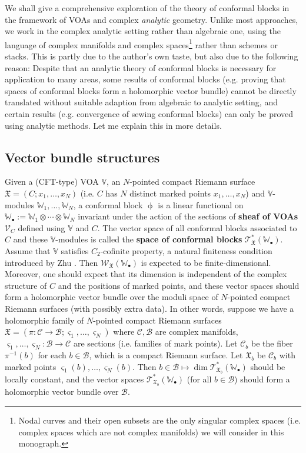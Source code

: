 \documentclass[12pt,a4paper,notitlepage]{report}
\theoremstyle{definition}
\theoremstyle{plain}
\newcommand{\fk}{\mathfrak}
\newcommand{\mc}{\mathcal}
\newcommand{\scr}{\mathscr}
\newcommand{\sgm}{\varsigma}
\newcommand{\blt}{\bullet}
\newcommand{\Vbb}{\mathbb V}
\newcommand{\Wbb}{\mathbb W}
\numberwithin{equation}{section}
\begin{document}
We shall give a comprehensive exploration of the theory of conformal blocks in the framework of VOAs and complex \emph{analytic} geometry. Unlike most approaches, we work in the complex analytic setting rather than algebraic one, using the language of complex manifolds and complex spaces\footnote{Nodal curves and their open subsets are the only singular complex spaces (i.e. complex spaces which are not complex manifolds) we will consider in this monograph.} rather than schemes or stacks. This is partly due to the author's own taste, but also due to the following reason: Despite that an analytic theory of conformal blocks is necessary for application to many areas,  some  results of conformal blocks (e.g. proving that spaces of conformal blocks form a holomorphic vector bundle) cannot be directly translated without suitable adaption from algebraic to  analytic setting, and certain results (e.g. convergence of sewing conformal blocks) can only be proved using analytic methods. Let me explain this in more details.

\subsection*{Vector bundle structures}


Given a (CFT-type) VOA $\Vbb$,   an $N$-pointed compact Riemann surface $\fk X=(C;x_1,\dots,x_N)$ (i.e. $C$ has $N$ distinct marked points $x_1,\dots,x_N$) and $\Vbb$-modules $\Wbb_1,\dots,\Wbb_N$, a conformal block $\upphi$ is a linear functional on $\Wbb_\blt:=\Wbb_1\otimes\cdots\otimes\Wbb_N$ invariant under the action of the sections of \textbf{sheaf of VOAs} $\scr V_C$ defined using $\Vbb$ and $C$. The vector space of all conformal blocks associated to $C$ and these $\Vbb$-modules is called the \textbf{space of conformal blocks} $\scr T_{\fk X}^*(\Wbb_\blt)$. Assume that $\Vbb$ satisfies $C_2$-cofinite property, a natural finiteness condition introduced by Zhu \cite{Zhu96}. Then  $\scr W_{\fk X}(\Wbb_\blt)$ is expected to be finite-dimensional. Moreover, one should expect that its dimension is independent of the complex structure of $C$ and the positions of marked points, and these vector spaces should form a holomorphic vector bundle over the moduli space of $N$-pointed compact Riemann surfaces (with possibly extra data). In other words, suppose we have a holomorphic family of $N$-pointed compact Riemann surfaces $\fk X=(\pi:\mc C\rightarrow\mc B;\sgm_1,\dots,\sgm_N)$ where $\mc C,\mc B$ are complex manifolds, $\sgm_1,\dots,\sgm_N:\mc B\rightarrow\mc C$ are sections (i.e. families of mark points). Let $\mc C_b$ be the fiber $\pi^{-1}(b)$ for each $b\in\mc B$, which is a compact Riemann surface. Let $\fk X_b$ be $\mc C_b$ with marked points $\sgm_1(b),\dots,\sgm_N(b)$. Then $b\in\mc B\mapsto\dim\scr T_{\fk X_b}^*(\Wbb_\blt)$ should be locally constant, and the vector spaces $\scr T_{\fk X_b}^*(\Wbb_\blt)$ (for all $b\in\mc B$) should form a holomorphic vector bundle over $\mc B$.
	
\end{document}
